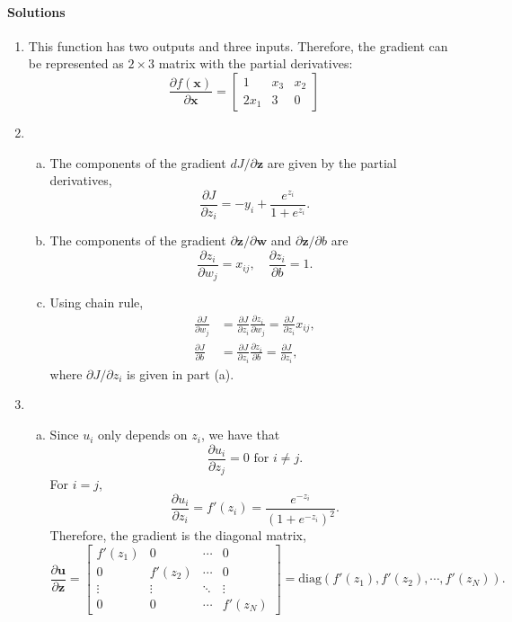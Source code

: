 \documentclass[11pt]{article}
\def\x{\times}
\newcommand{\ubf}{\mathbf{u}}
\newcommand{\wbf}{\mathbf{w}}
\newcommand{\xbf}{\mathbf{x}}
\newcommand{\zbf}{\mathbf{z}}
\begin{document}
\paragraph*{Solutions}
\begin{enumerate}
\item This function has two outputs and three inputs.  Therefore, the gradient can be represented as
$2 \x 3$ matrix with the partial derivatives:
\[
    \frac{\partial f(\xbf)}{\partial \xbf}
    = \left[   \begin{array}{ccc}
    1 & x_3 & x_2 \\
    2x_1 & 3 & 0
    \end{array}
    \right]
\]

\item
\begin{enumerate}[(a)]
\item The components of the gradient $dJ/\partial \zbf$ are given by the partial derivatives,
\[
    \frac{\partial J}{\partial z_i} = -y_i + \frac{e^{z_i}}{1+e^{z_i}}.
\]
\item  The components of the gradient $\partial \zbf/\partial \wbf$ and $\partial \zbf/\partial b$ are
\[
    \frac{\partial z_i}{\partial w_j} = x_{ij}, \quad \frac{\partial z_i}{\partial b} = 1.
\]

\item Using chain rule,
\begin{align*}
    \frac{\partial J}{\partial w_j} &= \frac{\partial J}{\partial z_i}\frac{\partial z_i}{\partial w_j} =
        \frac{\partial J}{\partial z_i}x_{ij}, \\
    \frac{\partial J}{\partial b} &= \frac{\partial J}{\partial z_i}\frac{\partial z_i}{\partial b} =
        \frac{\partial J}{\partial z_i},
\end{align*}
where $\partial J/\partial z_i$ is given in part (a).
\end{enumerate}

\item
\begin{enumerate}[(a)]
\item Since $u_i$ only depends on $z_i$, we have that
\[
    \frac{\partial u_i}{\partial z_j} = 0 \mbox{ for } i \neq j.
\]
For $i=j$,
\[
    \frac{\partial u_i}{\partial z_i} = f'(z_i) = \frac{e^{-z_i}}{(1+e^{-z_i})^2}.
\]
Therefore, the gradient is the diagonal matrix,
\[
    \frac{\partial \ubf}{\partial \zbf} = \left[
    \begin{array}{cccc}
    f'(z_1) & 0 & \cdots & 0 \\
    0 & f'(z_2) & \cdots & 0 \\
    \vdots & \vdots & \ddots & \vdots \\
    0 & 0 & \cdots & f'(z_N)
    \end{array} \right]  = \mathrm{diag}(f'(z_1),f'(z_2),\cdots,f'(z_N)).
\]


\end{enumerate}
\end{enumerate}
\end{document}

